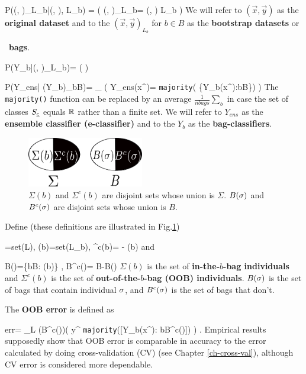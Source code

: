 \beq\color{blue}
P((, )_{L_b}|(, ), L_b)
=
\indi(\;\;\;
(, )_{L_b}= 
(, ) L_b
\;\;\;)
\eeq
We will refer to $(\vec{x}, \vec{y})$ as the
{\bf original dataset} and to
the $(\vec{x}, \vec{y})_{L_b}$
for $b\in B$
as the {\bf bootstrap datasets} or {\ {\bf bags}.

\beq\color{blue}
P(Y_b|(, )_{L_b})=
\indi(\;\;\;
\;\;\;)
\eeq

\beq\color{blue}
P(Y_{ens}| (Y_b)_{b\in B})=
\prod_\s
\indi(
\;\;\;
Y_{ens}(x^\s)=
{\tt majority}(
\{Y_b(x^\s):b\in B\})
\;\;\;)
\eeq
The {\tt majority()}
function can be replaced
by an average $\frac{1}{nbags}\sum_b$
in case
the set of classes $S_{\underline{c}}$
equals ${ \mathbb{R}}$ rather than a finite set.
We will refer to
$Y_{ens}$ as the {\bf ensemble
classifier (e-classifier)}
and to the $Y_b$
as the {\bf bag-classifiers}.


 


\begin{figure}[h!]
\centering
\includegraphics[width=2in]
{ran-forest/ran-forest-sets.png}
\caption
{$\Sigma(b)$ and $\Sigma^c(b)$
are disjoint sets whose union is $\Sigma$.
$B(\sigma)$ and $B^c(\sigma)$ 
are disjoint sets whose union is $B$.
} 
\label{fig-ran-forest-sets}
\end{figure}

Define 
(these definitions
are illustrated  in Fig.\ref{fig-ran-forest-sets})

\beq
\Sigma=set(L)\;,\;\;
\Sigma(b)=set(L_b)\;,\;\;
\Sigma^c(b)= \Sigma - \Sigma(b)
\eeq
and

\beq
B(\s)=\{b\in B: \s\in \Sigma(b)\}
\;,\;\;
B^c(\s)= B-B(\s)
\eeq
$\Sigma(b)$ is
the set of 
{\bf in-the-$b$-bag individuals}
and 
$\Sigma^c(b)$ is
the set of {\bf out-of-the-$b$-bag
 (OOB) individuals}. 
$B(\sigma)$
is the set of bags that
contain individual $\sigma$,
and $B^c(\sigma)$
is the set of bags that don't.

The {\bf OOB error} is defined as


\beq
err= \sum_{\s\in L} 
\indi(B^c(\s)\neq \emptyset)\indi(
\;\;\;y^\s\neq
{\tt majority}([Y_b(x^\s): b\in B^c(\s)])
\;\;\;)
\;.
\eeq
Empirical
results supposedly show that OOB error is comparable in 
accuracy to the error calculated
by doing cross-validation (CV)
 (see Chapter \ref{ch-cross-val}),
although CV error is considered
more dependable.

}
